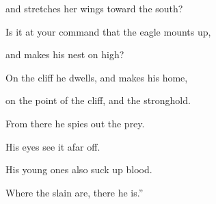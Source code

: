 {\par }{\QB and stretches her wings toward the south?
\par }{\Q {}Is it at your command that the eagle mounts up,
\par }{\QB and makes his nest on high?
\par }{\Q {}On the cliff he dwells, and makes his home,
\par }{\QB on the point of the cliff, and the stronghold.
\par }{\Q {}From there he spies out the prey.
\par }{\QB His eyes see it afar off.
\par }{\Q {}His young ones also suck up blood.
\par }{\QB Where the slain are, there he is.”
\par }{\BB \par }

